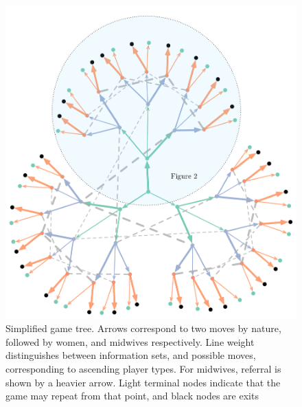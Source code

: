 \begin{figure}[H]
\begin{adjustbox}{center}
\includegraphics[width=119mm]{figures/rounded_clover_infosets}
\end{adjustbox}
\caption{Simplified game tree. Arrows correspond to two moves by nature, followed by women, and midwives respectively. Line weight distinguishes between information sets, and possible moves, corresponding to ascending player types. For midwives, referral is shown by a heavier arrow. Light terminal nodes indicate that the game may repeat from that point, and black nodes are exits}

\label{fig:simple_tree}
\end{figure}

